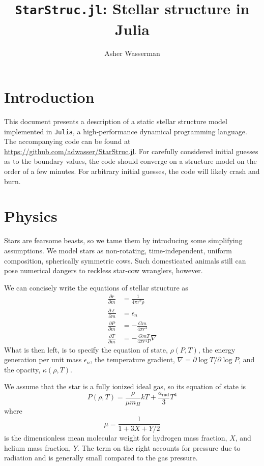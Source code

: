 \documentclass[onecolumn]{article}
\title{\texttt{StarStruc.jl}: Stellar structure in Julia}
\author{Asher Wasserman}
\date{}
\newcommand{\D}[2]{\ensuremath{\frac{\partial #1}{\partial #2}}}
\begin{document}
\maketitle

\section{Introduction}

This document presents a description of a static stellar structure model implemented in \texttt{Julia}, a high-performance dynamical programming language.  The accompanying code can be found at \url{https://github.com/adwasser/StarStruc.jl}.  For carefully considered initial guesses as to the boundary values, the code should converge on a structure model on the order of a few minutes.  For arbitrary initial guesses, the code will likely crash and burn.

\section{Physics}

Stars are fearsome beasts, so we tame them by introducing some simplifying assumptions.  We model stars as non-rotating, time-independent, uniform composition, spherically symmetric cows.  Such domesticated animals still can pose numerical dangers to reckless star-cow wranglers, however.


We can concisely write the equations of stellar structure as
\begin{align}
  \D{r}{m} &= \frac{1}{4\pi r^2 \rho} \label{eq:drdm} \\
  \D{\ell}{m} &= \epsilon_n  \label{eq:dldm} \\
  \D{P}{m} &= -\frac{Gm}{4\pi r^4} \label{eq:dPdm} \\
  \D{T}{m} &= -\frac{GmT}{4\pi r^4P} \nabla \label{eq:dTdm}
\end{align}
What is then left, is to specify the equation of state, $\rho(P, T)$, the energy generation per unit mass $\epsilon_n$, the temperature gradient, $\nabla = \partial\log T / \partial\log P$, and the opacity, $\kappa(\rho, T)$.

We assume that the star is a fully ionized ideal gas, so its equation of state is
\begin{equation}
  P(\rho, T) = \frac{\rho}{\mu m_H} kT + \frac{a_\text{rad}}{3} T^4
\end{equation}
where 
\begin{equation}
  \mu = \frac{1}{1 + 3X + Y/2}
\end{equation}
is the dimensionless mean molecular weight for hydrogen mass fraction, $X$, and helium mass fraction, $Y$.  The term on the right accounts for pressure due to radiation and is generally small compared to the gas pressure.
\end{document}
